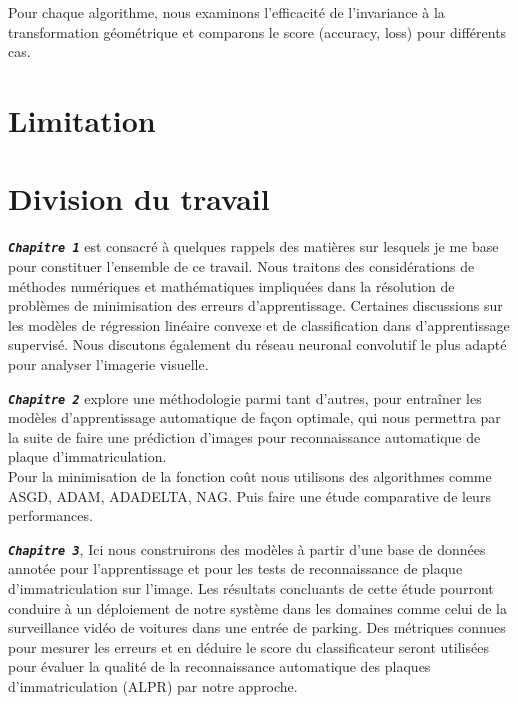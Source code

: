 		Pour chaque algorithme, nous examinons l'efficacité de l’invariance à la transformation géométrique et comparons le score (accuracy, loss) pour différents cas.
		
	\section{Limitation}
	\section{Division du travail}
		
		\begin{list}{}{En dehors de cette introduction, la partie conclusive et l'annexe, ce mémoire est organisé en trois chapitres comme suit.}
			\item \textbf{\textsl{\texttt{Chapitre 1}}} est consacré à quelques rappels des matières sur lesquels je me base pour constituer l'ensemble de ce travail.  Nous traitons des considérations de méthodes numériques et mathématiques impliquées dans la résolution de problèmes de minimisation des erreurs d’apprentissage. Certaines discussions sur les modèles de régression linéaire convexe et de classification dans d’apprentissage supervisé. Nous discutons également du réseau neuronal convolutif le plus adapté pour analyser l'imagerie visuelle.
			
			\item \textbf{\textsl{\texttt{Chapitre 2}}}  explore une méthodologie parmi tant d’autres, pour entraîner les modèles d’apprentissage automatique de façon optimale, qui nous permettra par la suite de faire une prédiction d’images pour reconnaissance automatique de plaque d'immatriculation. \\ Pour la minimisation de la fonction coût nous utilisons des algorithmes comme ASGD, ADAM, ADADELTA, NAG. Puis faire une étude comparative de leurs performances.
			
			\item \textbf{\textsl{\texttt{Chapitre 3}}}, Ici nous construirons des modèles à partir d’une base de données annotée pour l'apprentissage et pour les tests de reconnaissance  de plaque d'immatriculation sur l’image. Les résultats concluants de cette étude pourront conduire à un déploiement de notre système dans les domaines comme  celui de la surveillance vidéo de voitures dans une entrée de parking. Des métriques connues pour mesurer les erreurs et en déduire le score du classificateur seront utilisées pour évaluer la qualité de la reconnaissance automatique des plaques d’immatriculation (ALPR) par notre approche.
			
		\end{list}
	
	

		
		
		
		